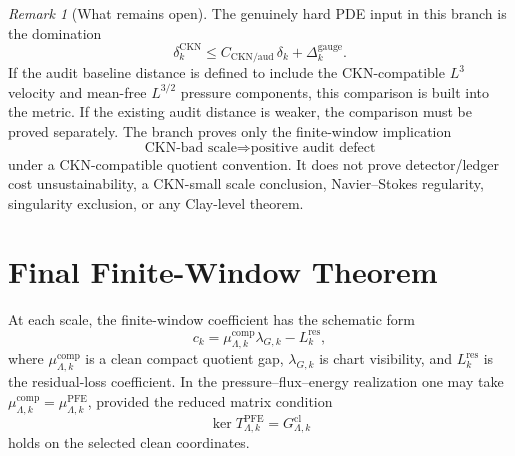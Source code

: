 \documentclass[11pt]{article}
\numberwithin{equation}{section}
\theoremstyle{plain}
\theoremstyle{definition}
\theoremstyle{remark}
\newtheorem{remark}[theorem]{Remark}
\newcommand{\cl}{\mathrm{cl}}
\newcommand{\comp}{\mathrm{comp}}
\begin{document}
\begin{remark}[What remains open]\label{rem:ckn-open}
The genuinely hard PDE input in this branch is the domination
\[
  \delta_k^{\mathrm{CKN}}
  \le
  C_{\mathrm{CKN/aud}}\,\delta_k+\Delta_k^{\mathrm{gauge}}.
\]
If the audit baseline distance is defined to include the CKN-compatible
\(L^3\) velocity and mean-free \(L^{3/2}\) pressure components, this
comparison is built into the metric.  If the existing audit distance is
weaker, the comparison must be proved separately.  The branch proves only the
finite-window implication
\[
  \text{CKN-bad scale}
  \Longrightarrow
  \text{positive audit defect}
\]
under a CKN-compatible quotient convention.  It does not prove detector/ledger
cost unsustainability, a CKN-small scale conclusion, Navier--Stokes
regularity, singularity exclusion, or any Clay-level theorem.
\end{remark}



\section{Final Finite-Window Theorem}
\label{sec:final-finite-window-theorem}

At each scale, the finite-window coefficient has the schematic form
\[
  c_k=\mu_{\Lambda,k}^{\comp}\lambda_{G,k}-L_k^{\mathrm{res}},
\]
where \(\mu_{\Lambda,k}^{\comp}\) is a clean compact quotient gap, \(\lambda_{G,k}\) is chart visibility, and \(L_k^{\mathrm{res}}\) is the residual-loss coefficient.  In the pressure--flux--energy realization one may take \(\mu_{\Lambda,k}^{\comp}=\mu_{\Lambda,k}^{\mathrm{PFE}}\), provided the reduced matrix condition
\[
  \ker T_{\Lambda,k}^{\mathrm{PFE}}=G_{\Lambda,k}^{\cl}
\]
holds on the selected clean coordinates.
\end{document}
